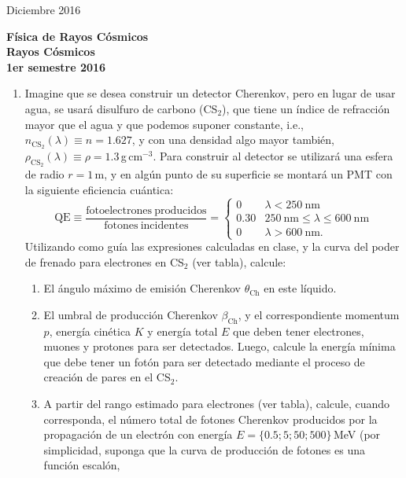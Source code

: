 \documentclass[11pt]{article}
\begin{document}
\pagestyle{empty}
{Diciembre 2016}
\begin{center}
	{\Large \bf Física de Rayos Cósmicos} \\
{ \large \bf Rayos Cósmicos} \\ {\bf 1er semestre 2016}
\end{center}

\setcounter{enumi}{0}      %
\begin{enumerate}
	\item Imagine que se desea construir un detector Cherenkov, pero en lugar
		de usar agua, se usará disulfuro de carbono (CS$_2$), que tiene un
		índice de refracción mayor que el agua y que podemos suponer constante,
		i.e., $n_{\mathrm{CS}_2}(\lambda) \equiv n = 1.627$, y con una densidad
		algo mayor también, $\rho_{\mathrm{CS}_2}(\lambda) \equiv \rho =
		1.3$\,g\,cm$^{-3}$. Para construir al detector se utilizará una esfera
		de radio $r=1$\,m, y en algún punto de su superficie se montará un PMT
		con la siguiente eficiencia cuántica:
		$$
			\mathrm{QE} \equiv \frac{\mathrm{fotoelectrones\
			producidos}}{\mathrm{fotones\ incidentes}} = 
			\begin{cases}
				0    & \lambda < 250\mathrm{\ nm} \\
				0.30 & 250\mathrm{\ nm} \leq \lambda \leq 600\mathrm{\ nm} \\
				0    & \lambda > 600\mathrm{\ nm}.
			\end{cases}
		$$
		Utilizando como guía las expresiones calculadas en clase, y la curva
		del poder de frenado para electrones en CS$_2$ (ver tabla), calcule:
		\begin{enumerate}
			\item El ángulo máximo de emisión Cherenkov $\theta_{\mathrm{Ch}}$
				en este líquido. 
			\item El umbral de producción Cherenkov $\beta_{\mathrm{Ch}}$, y el
				correspondiente momentum $p$, energía cinética $K$ y energía
				total $E$ que deben tener electrones, muones y protones para
				ser detectados.  Luego, calcule la energía mínima que debe
				tener un fotón para ser detectado mediante el proceso de
				creación de pares en el CS$_2$.
			\item A partir del rango estimado para electrones (ver tabla),
				calcule, cuando corresponda, el número total de fotones
				Cherenkov producidos por la propagación de un electrón con
				energía $E=\{0.5; 5; 50; 500\}$\,MeV (por simplicidad, suponga
				que la curva de producción de fotones es una función escalón,

\end{enumerate}
\end{enumerate}
\end{document}
